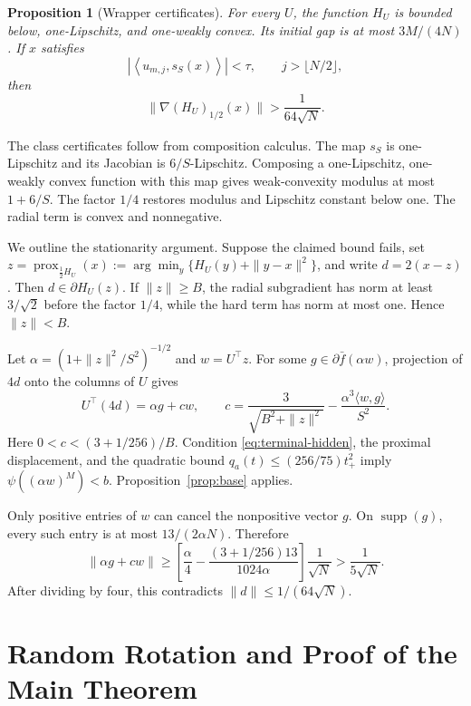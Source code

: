 \documentclass[twoside]{article}
\newtheorem{proposition}[theorem]{Proposition}
\newcommand{\prox}{\operatorname{prox}}
\newcommand{\supp}{\operatorname{supp}}
\begin{document}
\begin{proposition}[Wrapper certificates]
\label{prop:wrapper}
For every $U$, the function $H_U$ is bounded below, one-Lipschitz, and one-weakly convex. Its initial gap is at most $3M/(4N)$. If $x$ satisfies
\begin{equation}
 \left|\left\langle u_{m,j},s_S(x)\right\rangle\right|<\tau,
 \qquad j>\lfloor N/2\rfloor,
 \label{eq:terminal-hidden}
\end{equation}
then \[ \|\nabla(H_U)_{1/2}(x)\|>\frac1{64\sqrt N}. \]
\end{proposition}

The class certificates follow from composition calculus. The map $s_S$ is one-Lipschitz and its Jacobian is $6/S$-Lipschitz. Composing a one-Lipschitz, one-weakly convex function with this map gives weak-convexity modulus at most $1+6/S$. The factor $1/4$ restores modulus and Lipschitz constant below one. The radial term is convex and nonnegative.

We outline the stationarity argument. Suppose the claimed bound fails, set $z=\prox_{\frac12 H_U}(x):=\arg\min_y\{H_U(y)+\|y-x\|^2\}$, and write $d=2(x-z)$. Then $d\in\partial H_U(z)$. If $\|z\|\geq B$, the radial subgradient has norm at least $3/\sqrt2$ before the factor $1/4$, while the hard term has norm at most one. Hence $\|z\|<B$.

Let $\alpha=(1+\|z\|^2/S^2)^{-1/2}$ and $w=U^\top z$. For some $g\in\partial\bar f(\alpha w)$, projection of $4d$ onto the columns of $U$ gives
\begin{equation}
 U^\top(4d)=\alpha g+c w,
 \qquad
 c=\frac3{\sqrt{B^2+\|z\|^2}}
 -\frac{\alpha^3\langle w,g\rangle}{S^2}.
 \label{eq:cancellation}
\end{equation}
Here $0<c<(3+1/256)/B$. Condition \eqref{eq:terminal-hidden}, the proximal displacement, and the quadratic bound $q_a(t)\leq(256/75)t_+^2$ imply $\psi((\alpha w)^M)<b$. Proposition~\ref{prop:base} applies.

Only positive entries of $w$ can cancel the nonpositive vector $g$. On $\supp(g)$, every such entry is at most $13/(2\alpha N)$. Therefore \[ \|\alpha g+cw\| \geq \left[ \frac{\alpha}{4} -\frac{(3+1/256)13}{1024\alpha} \right]\frac1{\sqrt N} >\frac1{5\sqrt N}. \] After dividing by four, this contradicts $\|d\|\leq1/(64\sqrt N)$.

\section{Random Rotation and Proof of the Main Theorem}
\label{sec:rotation}
\end{document}
